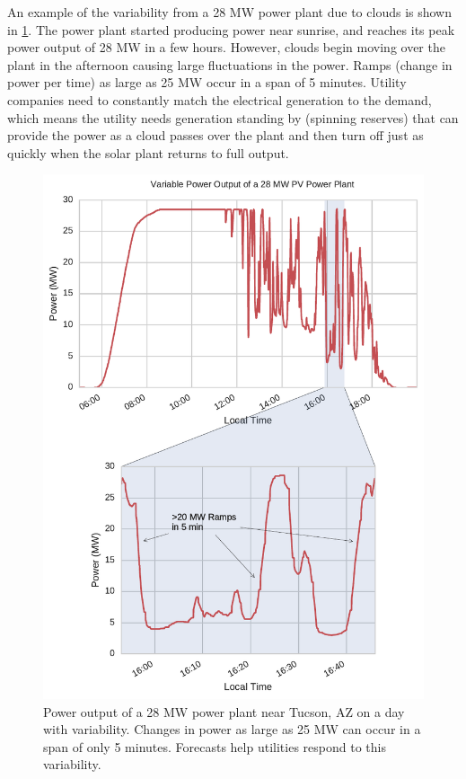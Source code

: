 An example of the variability from a 28 MW power plant due to clouds
is shown in \cref{fig:variability_example}.
The power plant started producing power near sunrise, and reaches its
peak power output of 28 MW in a few hours.
However, clouds begin moving over the plant in the afternoon causing
large fluctuations in the power.
Ramps (change in power per time) as large as 25 MW occur in a span of
5 minutes.
Utility companies need to constantly match the electrical generation
to the demand, which means the utility needs generation standing by
(spinning reserves) that can provide the power as a cloud passes over
the plant and then turn off just as quickly when the solar plant
returns to full output.


\begin{figure}[htbp]
\centering
\includegraphics[width=.9\textwidth]{figs/avalon_ramps.pdf}
\caption[Variable power output of a 28 MW solar power plant]{
Power output of a 28 MW power plant near Tucson, AZ on a day with
variability. Changes in power as large as 25 MW can occur in a span of
only 5 minutes. Forecasts help utilities respond to this variability.}
\label{fig:variability_example}
\end{figure}

